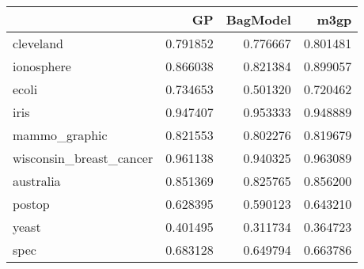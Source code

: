 \begin{tabular}{lrrr}
\toprule
{} &        GP &  BagModel &      m3gp \\
\midrule
cleveland               &  0.791852 &  0.776667 &  0.801481 \\
ionosphere              &  0.866038 &  0.821384 &  0.899057 \\
ecoli                   &  0.734653 &  0.501320 &  0.720462 \\
iris                    &  0.947407 &  0.953333 &  0.948889 \\
mammo\_graphic           &  0.821553 &  0.802276 &  0.819679 \\
wisconsin\_breast\_cancer &  0.961138 &  0.940325 &  0.963089 \\
australia               &  0.851369 &  0.825765 &  0.856200 \\
postop                  &  0.628395 &  0.590123 &  0.643210 \\
yeast                   &  0.401495 &  0.311734 &  0.364723 \\
spec                    &  0.683128 &  0.649794 &  0.663786 \\
\bottomrule
\end{tabular}
